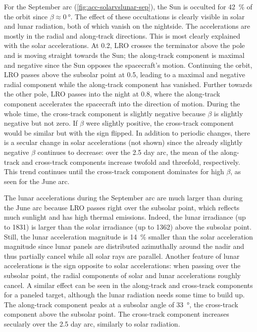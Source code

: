 For the September arc (\cref{fig:acc-solarvslunar-sep}), the Sun is occulted for \qty{42}{\percent} of the orbit since $\beta \approx \qty{0}{\degree}$. The effect of these occultations is clearly visible in solar and lunar radiation, both of which vanish on the nightside. The accelerations are mostly in the radial and along-track directions. This is most clearly explained with the solar accelerations. At 0.2, \gls{LRO} crosses the terminator above the pole and is moving straight towards the Sun; the along-track component is maximal and negative since the Sun opposes the spacecraft's motion. Continuing the orbit, \gls{LRO} passes above the subsolar point at 0.5, leading to a maximal and negative radial component while the along-track component has vanished. Further towards the other pole, \gls{LRO} passes into the night at 0.8, where the along-track component accelerates the spacecraft into the direction of motion. During the whole time, the cross-track component is slightly negative because $\beta$ is slightly negative but not zero. If $\beta$ were slightly positive, the cross-track component would be similar but with the sign flipped. In addition to periodic changes, there is a secular change in solar accelerations (not shown) since the already slightly negative $\beta$ continues to decrease: over the 2.5 day arc, the mean of the along-track and cross-track components increase twofold and threefold, respectively. This trend continues until the cross-track component dominates for high $\beta$, as seen for the June arc.

The lunar accelerations during the September arc are much larger than during the June arc because \gls{LRO} passes right over the subsolar point, which reflects much sunlight and has high thermal emissions. Indeed, the lunar irradiance (up to \qty{1831}{\irr}) is larger than the solar irradiance (up to \qty{1362}{\irr}) above the subsolar point. Still, the lunar acceleration magnitude is \qty{14}{\percent} smaller than the solar acceleration magnitude since lunar panels are distributed azimuthally around the nadir and thus partially cancel while all solar rays are parallel. Another feature of lunar accelerations is the sign opposite to solar accelerations: when passing over the subsolar point, the radial components of solar and lunar accelerations roughly cancel. A similar effect can be seen in the along-track and cross-track components for a paneled target, although the lunar radiation needs some time to build up. The along-track component peaks at a subsolar angle of \qty{33}{\degree}, the cross-track component above the subsolar point. The cross-track component increases secularly over the 2.5 day arc, similarly to solar radiation.

